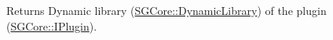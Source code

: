 \begin{DoxyReturn}{Returns}
Dynamic library (\mbox{\hyperlink{structSGCore_1_1DynamicLibrary}{SGCore\+::\+Dynamic\+Library}}) of the plugin (\mbox{\hyperlink{structSGCore_1_1IPlugin}{SGCore\+::\+IPlugin}}). 
\end{DoxyReturn}
